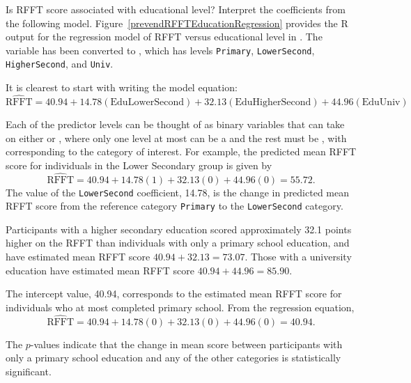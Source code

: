 \begin{examplewrap}
\begin{nexample}{Is RFFT score associated with educational level? Interpret the coefficients from the following model. Figure~\ref{prevendRFFTEducationRegression} provides the \textsf{R} output for the regression model of RFFT versus educational level in . The variable  has been converted to , which has levels \texttt{Primary}, \texttt{LowerSecond}, \texttt{HigherSecond}, and \texttt{Univ}.}

It is clearest to start with writing the model equation:
\[\widehat{\text{RFFT}} =  40.94 + 14.78(\text{EduLowerSecond}) + 32.13(\text{EduHigherSecond}) + 44.96(\text{EduUniv})\]

Each of the predictor levels can be thought of as binary variables that can take on either  or , where only one level at most can be a  and the rest must be , with  corresponding to the category of interest. For example, the predicted mean RFFT score for individuals in the Lower Secondary group is given by
\[\widehat{\text{RFFT}} =  40.94 + 14.78(1) + 32.13(0) + 44.96(0) = 55.72. \]
The value of the \texttt{LowerSecond} coefficient, 14.78, is the change in predicted mean RFFT score from the reference category \texttt{Primary} to the \texttt{LowerSecond} category. 

Participants with a higher secondary education scored approximately 32.1 points higher on the RFFT than individuals with only a primary school education, and have estimated mean RFFT score $40.94 + 32.13 = 73.07.$ Those with a university education have estimated mean RFFT score $40.94 + 44.96 = 85.90$.  

The intercept value, 40.94, corresponds to the estimated mean RFFT score for individuals who at most completed primary school. From the regression equation, 
\[\widehat{\text{RFFT}} =  40.94 + 14.78(0) + 32.13(0) + 44.96(0) = 40.94. \]

The $p$-values indicate that the change in mean score between participants with only a primary school education and any of the other categories is statistically significant.
\end{nexample}
\end{examplewrap}

